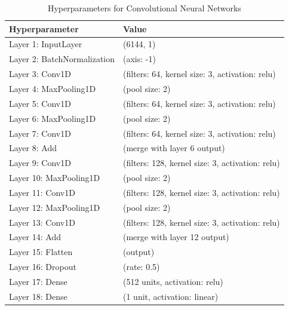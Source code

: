 \clearpage
\begin{table}[H]
\centering
\caption{Hyperparameters for Convolutional Neural Networks}
\begin{tabular}{ll}
    \toprule
    \textbf{Hyperparameter} & \textbf{Value} \\
    \midrule
    Layer 1: InputLayer & (6144, 1) \\
    Layer 2: BatchNormalization & (axis: -1) \\
    Layer 3: Conv1D & (filters: 64, kernel size: 3, activation: relu) \\
    Layer 4: MaxPooling1D & (pool size: 2) \\
    Layer 5: Conv1D & (filters: 64, kernel size: 3, activation: relu) \\
    Layer 6: MaxPooling1D & (pool size: 2) \\
    Layer 7: Conv1D & (filters: 64, kernel size: 3, activation: relu) \\
    Layer 8: Add & (merge with layer 6 output) \\
    Layer 9: Conv1D & (filters: 128, kernel size: 3, activation: relu) \\
    Layer 10: MaxPooling1D & (pool size: 2) \\
    Layer 11: Conv1D & (filters: 128, kernel size: 3, activation: relu) \\
    Layer 12: MaxPooling1D & (pool size: 2) \\
    Layer 13: Conv1D & (filters: 128, kernel size: 3, activation: relu) \\
    Layer 14: Add & (merge with layer 12 output) \\
    Layer 15: Flatten & (output) \\
    Layer 16: Dropout & (rate: 0.5) \\
    Layer 17: Dense & (512 units, activation: relu) \\
    Layer 18: Dense & (1 unit, activation: linear) \\
    \bottomrule
\end{tabular}
\label{tab:cnn_hyperparameters}
\end{table}
\FloatBarrier